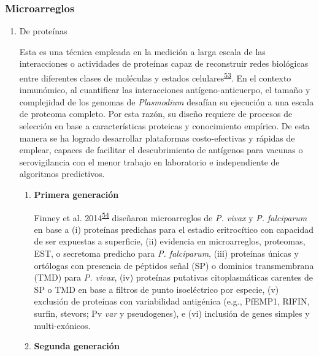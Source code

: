 \documentclass[]{article}
\begin{document}
\subsubsection{Microarreglos}\label{microarreglos}

\begin{enumerate}
\def\labelenumi{\alph{enumi}.}
\item
  De proteínas

  Esta es una técnica empleada en la medición a larga escala de las
  interacciones o actividades de proteínas capaz de reconstruir redes
  biológicas entre diferentes clases de moléculas y estados
  celulares\textsuperscript{\protect\hyperlink{ref-uzoma2013interactome}{53}}.
  En el contexto inmunómico, al cuantificar las interacciones
  antígeno-anticuerpo, el tamaño y complejidad de los genomas de
  \emph{Plasmodium} desafían su ejecución a una escala de proteoma
  completo. Por esta razón, su diseño requiere de procesos de selección
  en base a características proteicas y conocimiento empírico. De esta
  manera se ha logrado desarrollar plataformas costo-efectivas y rápidas
  de emplear, capaces de facilitar el descubrimiento de antígenos para
  vacunas o serovigilancia con el menor trabajo en laboratorio e
  independiente de algoritmos predictivos.

  \begin{enumerate}
  \def\labelenumii{\roman{enumii}.}
  \item
    \textbf{Primera generación}

    Finney et al.
    2014\textsuperscript{\protect\hyperlink{ref-Finney2014}{54}}
    diseñaron microarreglos de \emph{P. vivax} y \emph{P. falciparum} en
    base a (i) proteínas predichas para el estadio eritrocítico con
    capacidad de ser expuestas a superficie, (ii) evidencia en
    microarreglos, proteomas, EST, o secretoma predicho para \emph{P.
    falciparum}, (iii) proteínas únicas y ortólogas con presencia de
    péptidos señal (SP) o dominios transmembrana (TMD) para \emph{P.
    vivax}, (iv) proteínas putativas citoplasmáticas carentes de SP o
    TMD en base a filtros de punto isoeléctrico por especie, (v)
    exclusión de proteínas con variabilidad antigénica (e.g., PfEMP1,
    RIFIN, surfin, stevors; Pv \emph{var} y pseudogenes), e (vi)
    inclusión de genes simples y multi-exónicos.
  \item
    \textbf{Segunda generación}


\end{enumerate}
\end{enumerate}
\end{document}
